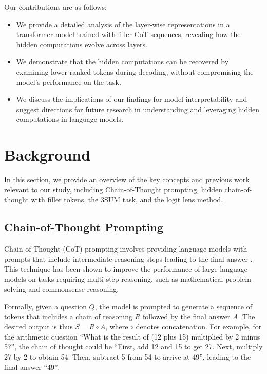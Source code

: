 \documentclass{article}
\begin{document}
Our contributions are as follows:

\begin{itemize}
    \item We provide a detailed analysis of the layer-wise representations in a transformer model trained with filler CoT sequences, revealing how the hidden computations evolve across layers.
    \item We demonstrate that the hidden computations can be recovered by examining lower-ranked tokens during decoding, without compromising the model's performance on the task.
    \item We discuss the implications of our findings for model interpretability and suggest directions for future research in understanding and leveraging hidden computations in language models.
\end{itemize}

\newpage
\section{Background}

In this section, we provide an overview of the key concepts and previous work relevant to our study, including Chain-of-Thought prompting, hidden chain-of-thought with filler tokens, the 3SUM task, and the logit lens method.

\subsection{Chain-of-Thought Prompting}

Chain-of-Thought (CoT) prompting involves providing language models with prompts that include intermediate reasoning steps leading to the final answer \cite{wei2022chain}. This technique has been shown to improve the performance of large language models on tasks requiring multi-step reasoning, such as mathematical problem-solving and commonsense reasoning.

Formally, given a question $Q$, the model is prompted to generate a sequence of tokens that includes a chain of reasoning $R$ followed by the final answer $A$. The desired output is thus $S = R \circ A$, where $\circ$ denotes concatenation. For example, for the arithmetic question ``What is the result of (12 plus 15) multiplied by 2 minus 5?'', the chain of thought could be ``First, add 12 and 15 to get 27. Next, multiply 27 by 2 to obtain 54. Then, subtract 5 from 54 to arrive at 49'', leading to the final answer ``49''.
\end{document}
